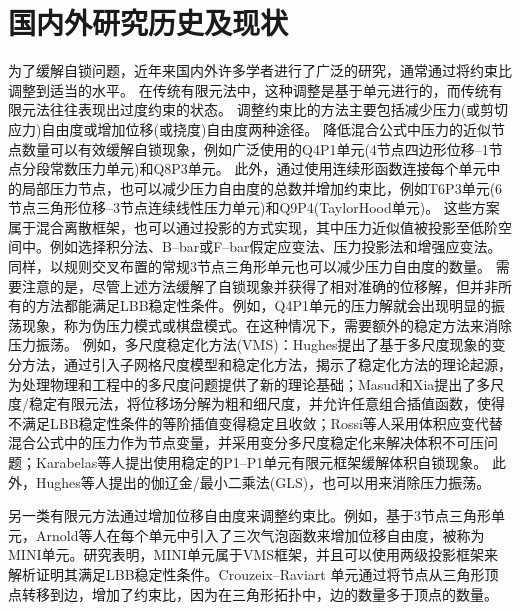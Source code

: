 \section{国内外研究历史及现状}
为了缓解自锁问题，近年来国内外许多学者进行了广泛的研究，通常通过将约束比调整到适当的水平。
在传统有限元法中，这种调整是基于单元进行的，而传统有限元法往往表现出过度约束的状态。
调整约束比的方法主要包括减少压力(或剪切应力)自由度或增加位移(或挠度)自由度两种途径。
降低混合公式中压力的近似节点数量可以有效缓解自锁现象，例如广泛使用的Q4P1单元(4节点四边形位移--1节点分段常数压力单元)和Q8P3单元。
此外，通过使用连续形函数连接每个单元中的局部压力节点，也可以减少压力自由度的总数并增加约束比，例如T6P3单元(6节点三角形位移--3节点连续线性压力单元)和Q9P4(TaylorHood单元)\cite{hood1974}。
这些方案属于混合离散框架，也可以通过投影的方式实现，其中压力近似值被投影至低阶空间中。例如选择积分法\cite{malkus1978,shilt2020}、B--bar或F--bar假定应变法\cite{simo1990,broccardo2009,coombs2018,saloustros2021,rodriguez2023}、压力投影法\cite{simo1985,dohrmann2004}和增强应变法\cite{lovadina2003}。
同样，以规则交叉布置的常规3节点三角形单元也可以减少压力自由度的数量\cite{bathe2001}。
需要注意的是，尽管上述方法缓解了自锁现象并获得了相对准确的位移解，但并非所有的方法都能满足LBB稳定性条件。例如，Q4P1单元的压力解就会出现明显的振荡现象，称为伪压力模式或棋盘模式\cite{bathe2001}。在这种情况下，需要额外的稳定方法来消除压力振荡。
例如，多尺度稳定化方法(VMS)：Hughes\cite{hughes1995}提出了基于多尺度现象的变分方法，通过引入子网格尺度模型和稳定化方法，揭示了稳定化方法的理论起源，为处理物理和工程中的多尺度问题提供了新的理论基础；Masud和Xia\cite{masud2005}提出了多尺度/稳定有限元法，将位移场分解为粗和细尺度，并允许任意组合插值函数，使得不满足LBB稳定性条件的等阶插值变得稳定且收敛；Rossi等人\cite{Rossi2021}采用体积应变代替混合公式中的压力作为节点变量，并采用变分多尺度稳定化来解决体积不可压问题；Karabelas等人\cite{karabelas2022}提出使用稳定的P1--P1单元有限元框架缓解体积自锁现象。
此外，Hughes等人\cite{hughes1986}提出的伽辽金/最小二乘法(GLS)，也可以用来消除压力振荡。

另一类有限元方法通过增加位移自由度来调整约束比。例如，基于3节点三角形单元，Arnold等人在每个单元中引入了三次气泡函数来增加位移自由度，被称为MINI单元\cite{arnold1984,auricchio2005}。研究表明，MINI单元属于VMS框架\cite{quarteroni1994}，并且可以使用两级投影框架来解析证明其满足LBB稳定性条件。Crouzeix--Raviart 单元\cite{crouzeix1973}通过将节点从三角形顶点转移到边，增加了约束比，因为在三角形拓扑中，边的数量多于顶点的数量。

